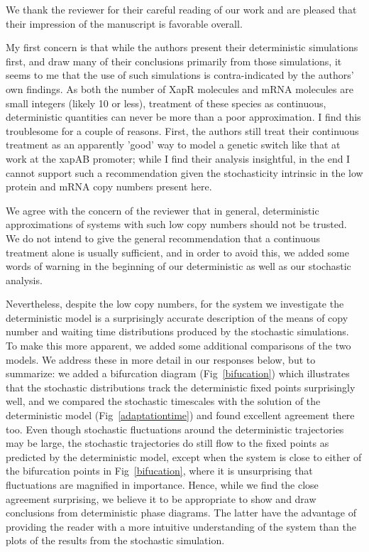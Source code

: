 \documentclass[11pt,letterpaper]{article}
\begin{document}
\begin{response}
We thank the reviewer for their careful reading of our work and are
pleased that their impression of the manuscript is favorable overall.
\end{response}

\begin{review}
My first concern is that while the authors present their deterministic
simulations first, and draw many of their conclusions primarily from
those simulations, it seems to me that the use of such simulations is
contra-indicated by the authors' own findings. As both the number of
XapR molecules and mRNA molecules are small integers (likely 10 or
less), treatment of these species as continuous, deterministic
quantities can never be more than a poor approximation. I find this
troublesome for a couple of reasons. First, the authors still treat
their continuous treatment as an apparently 'good' way to model a
genetic switch like that at work at the xapAB promoter; while I find
their analysis insightful, in the end I cannot support such a
recommendation given the stochasticity intrinsic in the low protein and
mRNA copy numbers present here.
\end{review}

\begin{response}
We agree with the concern of the reviewer that in general, deterministic
approximations of systems with such low copy numbers should not be
trusted. We do not intend to give the general recommendation that a
continuous treatment alone is usually sufficient, and in order to avoid
this, we added some words of warning in the beginning of our
deterministic as well as our stochastic analysis.

Nevertheless, despite the low copy numbers,
for the system we investigate the deterministic model is a
surprisingly accurate description of the means of copy number and
waiting time distributions produced by the stochastic simulations.
To make this more apparent, we added some additional comparisons of the two
models. We address these in more detail in our responses below,
but to summarize: we added a bifurcation diagram
(Fig~\ref{bifucation}) which illustrates that the stochastic
distributions track the deterministic fixed points surprisingly well,
and we compared the stochastic timescales with the solution of the
deterministic model (Fig~\ref{adaptationtime}) and found excellent
agreement there too.
Even though stochastic fluctuations around the deterministic
trajectories may be large, the stochastic trajectories do still flow to
the fixed points as predicted by the deterministic model, except when
the system is close to either of the bifurcation points in
Fig~\ref{bifucation}, where it is unsurprising that fluctuations are
magnified in importance.
Hence, while we find the close agreement surprising, we believe it to be
appropriate to show and draw conclusions from deterministic phase
diagrams. The latter have the advantage of providing the reader with a
more intuitive understanding of the system than the plots of the results
from the stochastic simulation.
\end{response}
\end{document}
